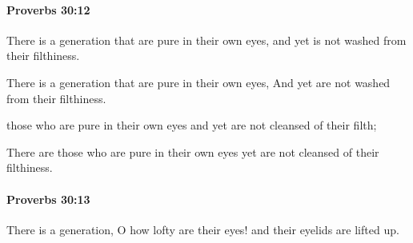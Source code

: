 		\paragraph{Proverbs 30:12} %
			\label{PROVERBS-30-12}

			There is a generation that are pure in their own eyes, and yet is not washed from their filthiness.

			\begin{versebox}
					\item[BHS] 
					\item[ASV] There is a generation that are pure in their own eyes, And yet are not washed from their filthiness.
					\item[NIV] those who are pure in their own eyes and yet are not cleansed of their filth;
					\item[NRSV] There are those who are pure in their own eyes yet are not cleansed of their filthiness.
			\end{versebox}

		\paragraph{Proverbs 30:13} %
			\label{PROVERBS-30-13}

			There is a generation, O how lofty are their eyes! and their eyelids are lifted up.

